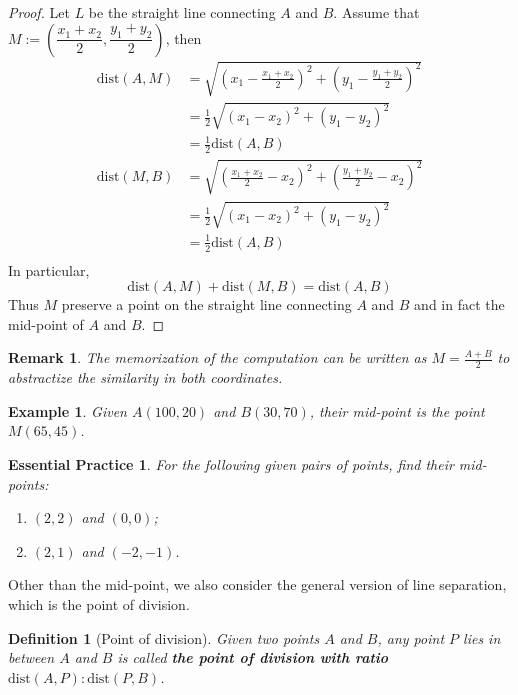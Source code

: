 \documentclass[12pt]{article}
\newtheorem{definition}{Definition}[section]
\newtheorem*{remark}{Remark}
\newtheorem*{example}{Example}
\newtheorem{exercise}{Essential Practice}[subsection]
\begin{document}
    \begin{proof}
        Let $L$ be the straight line connecting $A$ and $B$. Assume that $M:=(\dfrac{x_1+x_2}{2},\dfrac{y_1+y_2}{2})$, then\begin{align*}
            \mathrm{dist}(A,M)&=\sqrt{(x_1-\frac{x_1+x_2}{2})^2+(y_1-\frac{y_1+y_2}{2})^2}\\
            &=\frac{1}{2}\sqrt{(x_1-x_2)^2+(y_1-y_2)^2}\\
            &=\frac{1}{2}\mathrm{dist}(A,B)\\
            \mathrm{dist}(M,B)&=\sqrt{(\frac{x_1+x_2}{2}-x_2)^2+(\frac{y_1+y_2}{2}-x_2)^2}\\
            &=\frac{1}{2}\sqrt{(x_1-x_2)^2+(y_1-y_2)^2}\\
            &=\frac{1}{2}\mathrm{dist}(A,B)\\
        \end{align*}
        In particular, $$\mathrm{dist}(A,M)+\mathrm{dist}(M,B)=\mathrm{dist}(A,B)$$
        Thus $M$ preserve a point on the straight line connecting $A$ and $B$ and in fact the mid-point of $A$ and $B$.
    \end{proof}

    \begin{remark}
        The memorization of the computation can be written as $M=\frac{A+B}{2}$ to abstractize the similarity in both coordinates.
    \end{remark}

    \begin{example}
        Given $A(100,20)$ and $B(30,70)$, their mid-point is the point $M(65,45)$.
    \end{example}

    \begin{exercise}
        For the following given pairs of points, find their mid-points:\begin{enumerate}
            \item $(2,2)$ and $(0,0)$;
            \item $(2,1)$ and $(-2,-1)$.
        \end{enumerate}
    \end{exercise}

    Other than the mid-point, we also consider the general version of line separation, which is the point of division.

    \begin{definition}[Point of division]
        Given two points $A$ and $B$, any point $P$ lies in between $A$ and $B$ is called \textbf{the point of division with ratio $\mathrm{dist}(A,P):\mathrm{dist}(P,B)$}.
    \end{definition}
\end{document}
